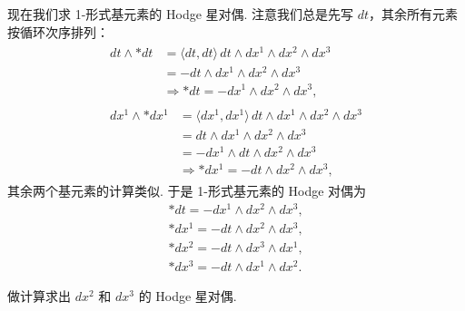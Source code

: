 现在我们求 1-形式基元素的 Hodge 星对偶. 注意我们总是先写 $dt$，其余所有元素按循环次序排列：
\begin{align*}
\begin{aligned}
dt\wedge\ast dt&=\langle dt,dt\rangle\,dt\wedge dx^1\wedge dx^2\wedge dx^3\\
&=-dt\wedge dx^1\wedge dx^2\wedge dx^3\\
&\Rightarrow\ast dt=-dx^1\wedge dx^2\wedge dx^3,
\end{aligned} \\
\begin{aligned}
dx^1\wedge\ast dx^1&=\langle dx^1,dx^1\rangle\,dt\wedge dx^1\wedge dx^2\wedge dx^3\\
&=dt\wedge dx^1\wedge dx^2\wedge dx^3\\
&=-dx^1\wedge dt\wedge dx^2\wedge dx^3\\
&\Rightarrow\ast dx^1=-dt\wedge dx^2\wedge dx^3,
\end{aligned}
\end{align*}
其余两个基元素的计算类似. 于是 1-形式基元素的 Hodge 对偶为
\begin{align*}
\ast dt=-dx^1\wedge dx^2\wedge dx^3, \\
\ast dx^1=-dt\wedge dx^2\wedge dx^3, \\
\ast dx^2=-dt\wedge dx^3\wedge dx^1, \\
\ast dx^3=-dt\wedge dx^1\wedge dx^2 .
\end{align*}

\begin{question}\label{q:12-6}
做计算求出 $dx^2$ 和 $dx^3$ 的 Hodge 星对偶.
\end{question}

